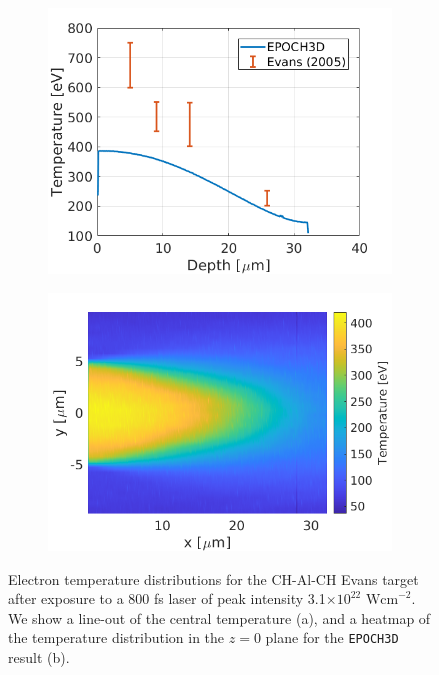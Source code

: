 \documentclass[12pt]{article}
\numberwithin{equation}{section}
\begin{document}
\begin{figure}
\centering
\begin{subfigure}{.49\textwidth}
  \centering
  \includegraphics[width=1\linewidth]{Figures/bench_Evans_line.png}
  \caption{}
\end{subfigure}%
\begin{subfigure}{.49\textwidth}
  \centering
  \includegraphics[width=1\linewidth]{Figures/bench_Evans_heat.png}
  \caption{}
\end{subfigure}
\caption{Electron temperature distributions for the CH-Al-CH Evans target after exposure to a 800 fs laser of peak intensity 3.1$\times 10^{22} \text{ Wcm}^{-2}$. We show a line-out of the central temperature (a), and a heatmap of the temperature distribution in the $z=0$ plane for the \texttt{EPOCH3D} result (b).}
\label{fig:bench:evans}
\end{figure}
\end{document}
